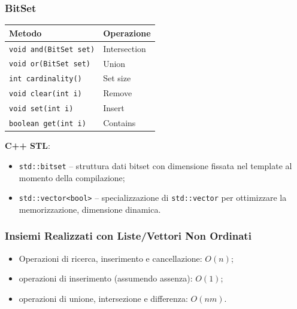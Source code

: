 \documentclass[12pt, a4paper]{article}
\begin{document}
\subsubsection{BitSet}

\begin{tcolorbox}[colback=lightergray!10, colframe=tocsec, title=\textbf{Java -- \texttt{class java.util.BitSet}}]
\begin{center}
\begin{tabular}{ll}
\toprule
\textbf{Metodo} & \textbf{Operazione} \\
\midrule
\texttt{void and(BitSet set)} & Intersection \\
\texttt{void or(BitSet set)} & Union \\
\texttt{int cardinality()} & Set size \\
\texttt{void clear(int i)} & Remove \\
\texttt{void set(int i)} & Insert \\
\texttt{boolean get(int i)} & Contains \\
\bottomrule
\end{tabular}
\end{center}
\end{tcolorbox}

\textbf{C++ STL}:
\begin{itemize}
    \item \texttt{std::bitset} -- struttura dati bitset con dimensione fissata nel template al momento della compilazione;
    \item \texttt{std::vector<bool>} -- specializzazione di \texttt{std::vector} per ottimizzare la memorizzazione, dimensione dinamica.
\end{itemize}

\subsubsection{Insiemi Realizzati con Liste/Vettori Non Ordinati}

\begin{tcolorbox}[colback=lightergray!5, colframe=tocsubsec, title=\textbf{Costo Operazioni}]
\begin{itemize}
    \item Operazioni di ricerca, inserimento e cancellazione: $O(n)$;
    \item operazioni di inserimento (assumendo assenza): $O(1)$;
    \item operazioni di unione, intersezione e differenza: $O(nm)$.
\end{itemize}
\end{tcolorbox}
\end{document}
